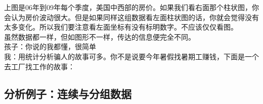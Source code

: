 上图是06年到09年每个季度，美国中西部的房价。如果我们看右面那个柱状图，你会认为房价波动很大。但是如果同样这组数据看左面柱状图的话，你就会觉得没有太多变化。所以我们要注意看左面坐标有没有标明数字。不应该仅仅看图。\\
虽然数据都一样，但如图形不一样，传达的信息便完全不同。\\
孩子：你说的我都懂，很简单\\
我：用统计分析骗人的故事可多。你不是说要今年暑假找暑期工赚钱，下面是一个去工厂找工作的故事：\\


\hypertarget{ux5982ux4f55ux753bux830eux53f6ux56festem-and-leaf-plot}{%
\subsection{分析例子：连续与分组数据}\label{ux5982ux4f55ux753bux830eux53f6ux56festem-and-leaf-plot}}

